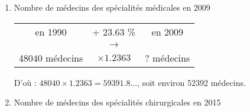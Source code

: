 \documentclass[12pt,a4paper]{article}
\begin{document}
\begin{enumerate}[label=\arabic*. ]
\begin{mybilan2}{Taux d'évolution et coefficient multiplicateur}
		\underline{Remarque} : Un taux d'évolution positif traduit une hausse, un taux d'évolution négatif traduit une baisse.\\
		
		\underline{Coefficients multiplicateurs :} 
		\begin{itemize}
			\item {} une grandeur de $t \%$ revient à multiplier cette grandeur par $(1 + \dfrac{t}{100})$.
			
			\item \underline{Exemple :} $+ 5 \% = \times \num{1.05}$ ; $+ 20 \% = \times \num{1.20}$ \\
			
			\item {} une grandeur de $t \%$ revient à multiplier cette grandeur par $\qquad (1 - \dfrac{t}{100})$.
			\item \underline{Exemple :} $- 12 \% = \times \num{0.88}$ ; $- 3 \% = \times \num{0.97}$ \\
			
			\item Dans le cas d'une , le coefficient multiplicateur est .
			
			\item Dans le cas d'une , le coefficient multiplicateur est .
		\end{itemize}
		
		
		
	\end{mybilan2}
	
	\item Nombre de médecins des spécialités médicales en 2009 
	
	\begin{table}[h!]
		\centering
		\begin{tabular}{|ccc|}
			\hline
			en \num{1990} & + \num{23.63} \%  & en \num{2009} \\
			& {\LARGE $\rightarrow$} &			\\
			\num{48040} médecins& $\times \num{1.2363}$ & ? médecins \\
			\hline
		\end{tabular}
	\end{table}
	
	D'où : $\num{48040} \times \num{1.2363} = \num{59391.8}...$, soit environ \num{52392} médecins.
	
	\item Nombre de médecins des spécialités chirurgicales en 2015 
	

\end{enumerate}
\end{document}
